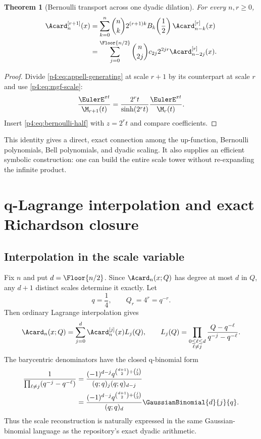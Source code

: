 \documentclass[11pt]{article}
\numberwithin{equation}{section}
\newtheorem{theorem}{Theorem}[section]
\theoremstyle{definition}
\theoremstyle{remark}
\begin{document}
\begin{theorem}[Bernoulli transport across one dyadic dilation]
\label{p4:thm:bernoulli-transport}
For every $n,r\ge0$,
\begin{align}
 \Acard_n^{[r+1]}(x)
 &=\sum_{k=0}^{n}\binom nk
  2^{(r+1)k}B_k\!\left(\frac12\right)
  \Acard_{n-k}^{[r]}(x)
 \label{p4:eq:bernoulli-transport}\\
 &=\sum_{j=0}^{\Floor{n/2}}
  \binom n{2j}c_{2j}2^{2jr}
  \Acard_{n-2j}^{[r]}(x).
 \label{p4:eq:bernoulli-transport-even}
\end{align}
\end{theorem}

\begin{proof}
Divide \eqref{p4:eq:appell-generating} at scale $r+1$ by its counterpart at scale $r$ and use \eqref{p4:eq:mgf-scale}:
\[
 \frac{\EulerE^{xt}}{\M_{r+1}(t)}
 =\frac{2^rt}{\sinh(2^rt)}\frac{\EulerE^{xt}}{\M_r(t)}.
\]
Insert \eqref{p4:eq:bernoulli-half} with $z=2^rt$ and compare coefficients.
\end{proof}

This identity gives a direct, exact connection among the up-function, Bernoulli polynomials, Bell polynomials, and dyadic scaling.  It also supplies an efficient symbolic construction: one can build the entire scale tower without re-expanding the infinite product.

\section{q-Lagrange interpolation and exact Richardson closure}
\label{p4:sec:qscale}

\subsection{Interpolation in the scale variable}
Fix $n$ and put $d=\Floor{n/2}$.  Since $\Acard_n(x;Q)$ has degree at most $d$ in $Q$, any $d+1$ distinct scales determine it exactly.  Let
\begin{equation}
 q=\frac14,
 \qquad Q_r=4^r=q^{-r}.
 \label{p4:eq:qscale-nodes}
\end{equation}
Then ordinary Lagrange interpolation gives
\begin{equation}
 \Acard_n(x;Q)
 =\sum_{j=0}^{d}\Acard_n^{[j]}(x)L_j(Q),
 \qquad
 L_j(Q)=\prod_{\substack{0\le\ell\le d\\\ell\ne j}}
 \frac{Q-q^{-\ell}}{q^{-j}-q^{-\ell}}.
 \label{p4:eq:scale-lagrange}
\end{equation}
The barycentric denominators have the closed q-binomial form
\begin{align}
 \frac1{\prod_{\ell\ne j}(q^{-j}-q^{-\ell})}
 &=\frac{(-1)^{d-j}q^{\binom{d+1}{2}+\binom j2}}
 {(q;q)_j(q;q)_{d-j}}
 \label{p4:eq:barycentric-q}\\
 &=\frac{(-1)^{d-j}q^{\binom{d+1}{2}+\binom j2}}
 {(q;q)_d}\GaussianBinomial{d}{j}{q}.
 \notag
\end{align}
Thus the scale reconstruction is naturally expressed in the same Gaussian-binomial language as the repository's exact dyadic arithmetic.
\end{document}
